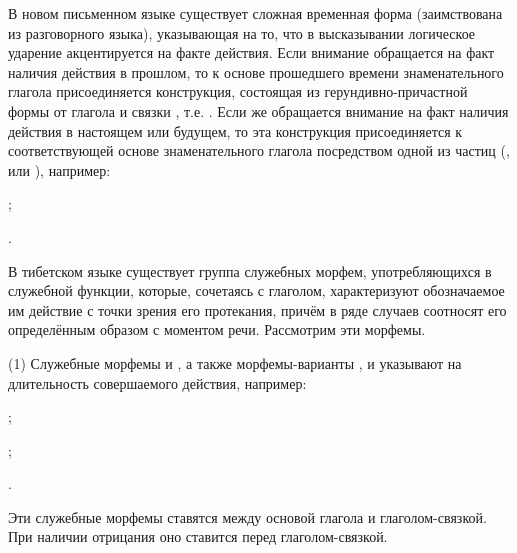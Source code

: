 В новом письменном языке существует сложная временная форма (заимствована из разговорного языка), указывающая на то, что в высказывании логическое ударение акцентируется на факте действия. Если внимание обращается на факт наличия действия в прошлом, то к основе прошедшего времени знаменательного глагола присоединяется конструкция, состоящая из герундивно-причастной формы от глагола  и связки , т.е. . Если же обращается внимание на факт наличия действия в настоящем или будущем, то эта конструкция присоединяется к соответствующей основе знаменательного глагола посредством одной из частиц (,  или ), например:
\begin{prfsample}
	\item {};
	\item {}.
\end{prfsample}

В тибетском языке существует группа служебных морфем, употребляющихся в служебной функции, которые, сочетаясь с глаголом, характеризуют обозначаемое им действие с точки зрения его протекания, причём в ряде случаев соотносят его определённым образом с моментом речи. Рассмотрим эти морфемы.

(1) Служебные морфемы  и , а также морфемы-варианты ,  и  указывают на длительность совершаемого действия, например:
\begin{prfsample}
	\item {};
	\item {};
	\item {}.
\end{prfsample}
Эти служебные морфемы ставятся между основой глагола и глаголом-связкой. При наличии отрицания оно ставится перед глаголом-связкой.

